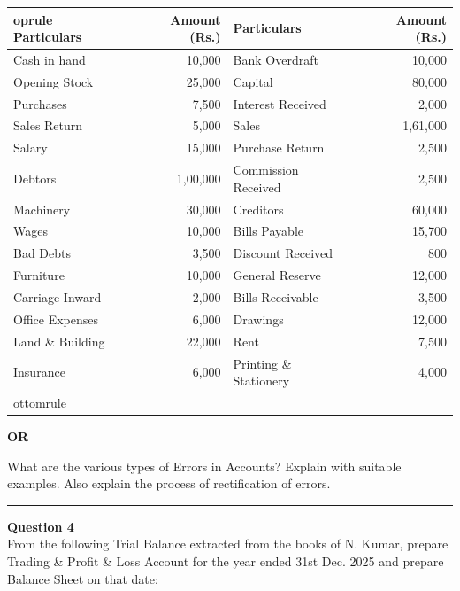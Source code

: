 \documentclass[11pt,a4paper]{article}
\begin{document}
\begin{center}
\small

\begin{tabular}{l r l r}
 oprule
   \textbf{Particulars} &   \textbf{Amount (Rs.)} &   \textbf{Particulars} &   \textbf{Amount (Rs.)} \\
\midrule
Cash in hand & 10,000 & Bank Overdraft & 10,000 \\
Opening Stock & 25,000 & Capital & 80,000 \\
Purchases & 7,500 & Interest Received & 2,000 \\
Sales Return & 5,000 & Sales & 1,61,000 \\
Salary & 15,000 & Purchase Return & 2,500 \\
Debtors & 1,00,000 & Commission Received & 2,500 \\
Machinery & 30,000 & Creditors & 60,000 \\
Wages & 10,000 & Bills Payable & 15,700 \\
Bad Debts & 3,500 & Discount Received & 800 \\
Furniture & 10,000 & General Reserve & 12,000 \\
Carriage Inward & 2,000 & Bills Receivable & 3,500 \\
Office Expenses & 6,000 & Drawings & 12,000 \\
Land \& Building & 22,000 & Rent & 7,500 \\
Insurance & 6,000 & Printing \& Stationery & 4,000 \\
ottomrule
\end{tabular}
\end{center}


\begin{center}   \textbf{OR}\end{center}

What are the various types of Errors in Accounts? Explain with suitable examples. Also explain the process of rectification of errors.

\medskip\rule{\linewidth}{0.2pt}\medskip




\noindent   \textbf{Question 4} \\
From the following Trial Balance extracted from the books of N. Kumar, prepare Trading \& Profit \& Loss Account for the year ended 31st Dec. 2025 and prepare Balance Sheet on that date:
\end{document}
